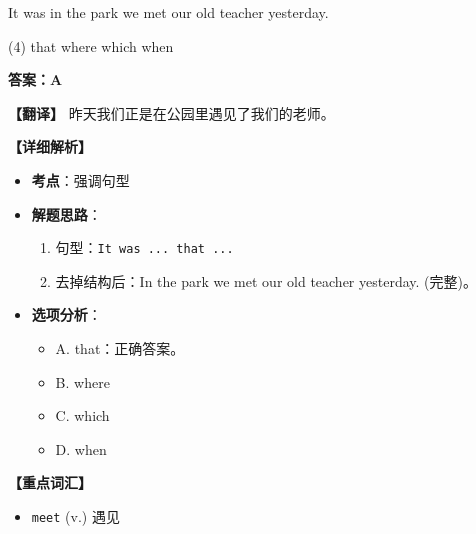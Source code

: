 \documentclass[11pt, a4paper]{article}
\newcommand{\analysis}[4]{
    \begin{solutionbox}
        \textbf{答案：#1}
        
        \textbf{【翻译】} #2
        
        \textbf{【详细解析】}
        #3
        
        \textbf{【重点词汇】}
        #4
    \end{solutionbox}
}
\newcommand{\blank}{\underline{\hspace{1.5cm}}}
\begin{document}
\begin{questions}
    \item It was in the park \blank we met our old teacher yesterday.
    \begin{tasks}(4)
        \task that \task where \task which \task when
    \end{tasks}
    \analysis{A}{昨天我们正是在公园里遇见了我们的老师。}{
        \begin{itemize}
            \item \textbf{考点}：强调句型
            \item \textbf{解题思路}：
                \begin{enumerate}
                    \item 句型：\texttt{It was ... that ...}
                    \item 去掉结构后：In the park we met our old teacher yesterday. (完整)。
                \end{enumerate}
            \item \textbf{选项分析}：
                \begin{itemize}
                    \item A. that：正确答案。
                    \item B. where
                    \item C. which
                    \item D. when
                \end{itemize}
        \end{itemize}
    }{
        \begin{itemize}
            \item \texttt{meet} (v.) 遇见
        \end{itemize}
    }


\end{questions}
\end{document}

